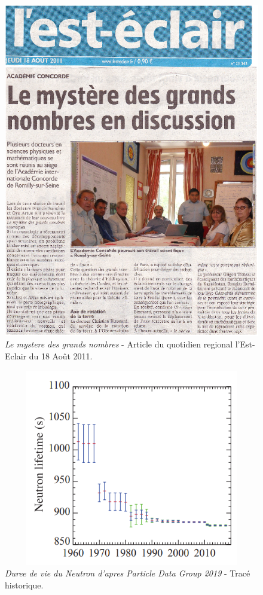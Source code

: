 \documentclass[a4paper,12pt]{article}
\begin{document}
\begin{appendix}
\begin{figure}
\centering
\includegraphics{./figures/lesteclair.png}
\caption [L'est-Eclair: Le mystere des grands nombres]{\textit{Le mystere des grands nombres} - Article du quotidien regional l'Est-Eclair du 18 Ao\^ut 2011.} 
\label{fig:5:figure5}
\end{figure}


\begin{figure}
\centering
\includegraphics[width=13.5cm,height=8.6cm]{./figures/neutron-lifetime-pdg.png}
\caption[Mesures de la duree de vie du neutron depuis 1962]{\textit{Duree de vie du Neutron d'apres Particle Data Group 2019} - Tracé historique.} 
\label{fig:6:figure6}
\end{figure}


\end{appendix}
\end{document}
